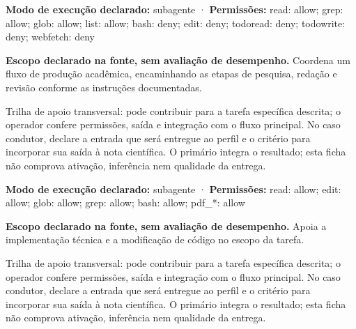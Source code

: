 \begin{arquitetura}
\textbf{Modo de execução declarado:} subagente · \textbf{Permissões:} read: allow; grep: allow; glob: allow; list: allow; bash: deny; edit: deny; todoread: deny; todowrite: deny; webfetch: deny
\end{arquitetura}


\begin{descricao}
\textbf{Escopo declarado na fonte, sem avaliação de desempenho.}
Coordena um fluxo de produção acadêmica, encaminhando as etapas de pesquisa, redação e revisão conforme as instruções documentadas.
\end{descricao}

\begin{funcao}
Trilha de apoio transversal: pode contribuir para a tarefa específica descrita; o operador confere permissões, saída e integração com o fluxo principal. No caso condutor, declare a entrada que será entregue ao perfil e o critério para incorporar sua saída à nota científica. O primário integra o resultado; esta ficha não comprova ativação, inferência nem qualidade da entrega.
\end{funcao}

\begin{arquitetura}
\textbf{Modo de execução declarado:} subagente · \textbf{Permissões:} read: allow; edit: allow; glob: allow; grep: allow; bash: allow; pdf\_*: allow
\end{arquitetura}


\begin{descricao}
\textbf{Escopo declarado na fonte, sem avaliação de desempenho.}
Apoia a implementação técnica e a modificação de código no escopo da tarefa.
\end{descricao}

\begin{funcao}
Trilha de apoio transversal: pode contribuir para a tarefa específica descrita; o operador confere permissões, saída e integração com o fluxo principal. No caso condutor, declare a entrada que será entregue ao perfil e o critério para incorporar sua saída à nota científica. O primário integra o resultado; esta ficha não comprova ativação, inferência nem qualidade da entrega.
\end{funcao}

